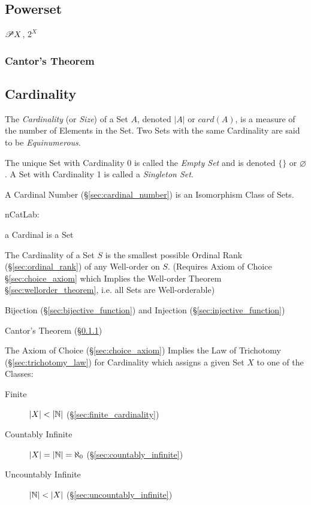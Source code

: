 \subsection{Powerset}\label{sec:powerset}

$\mathscr{P}{X}$, $2^X$

\subsubsection{Cantor's Theorem}\label{sec:cantors_theorem}



\subsection{Cardinality}\label{sec:cardinality}

The \emph{Cardinality} (or \emph{Size}) of a Set $A$, denoted $|A|$ or
$card(A)$, is a measure of the number of Elements in the Set. Two Sets
with the same Cardinality are said to be \emph{Equinumerous}.

The unique Set with Cardinality 0 is called the \emph{Empty Set} and
is denoted $\{\}$ or $\varnothing$. A Set with Cardinality 1 is called a
\emph{Singleton Set}.

A Cardinal Number (\S\ref{sec:cardinal_number}) is an Isomorphism
Class of Sets.

nCatLab:

a Cardinal is a Set

The Cardinality of a Set $S$ is the smallest possible Ordinal Rank
(\S\ref{sec:ordinal_rank}) of any Well-order on $S$. (Requires Axiom
of Choice \S\ref{sec:choice_axiom} which Implies the Well-order
Theorem \S\ref{sec:wellorder_theorem}, i.e. all Sets are
Well-orderable)

Bijection (\S\ref{sec:bijective_function}) and Injection
(\S\ref{sec:injective_function})

Cantor's Theorem (\S\ref{sec:cantors_theorem})

The Axiom of Choice (\S\ref{sec:choice_axiom}) Implies the Law of
Trichotomy (\S\ref{sec:trichotomy_law}) for Cardinality which assigns
a given Set $X$ to one of the Classes:

\begin{description}
\item [Finite] $|X| < |\mathbb{N}|$ (\S\ref{sec:finite_cardinality})
\item [Countably Infinite] $|X| = |\mathbb{N}| = \aleph_0$
  (\S\ref{sec:countably_infinite})
\item [Uncountably Infinite] $|\mathbb{N}| < |X|$
  (\S\ref{sec:uncountably_infinite})
\end{description}

